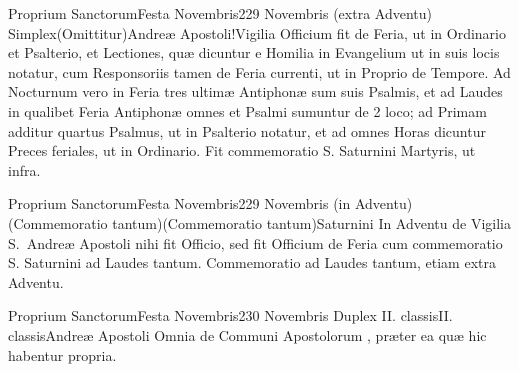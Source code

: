 \documentclass[nocturnale-romanum.tex]{subfiles}
\begin{document}
	{Proprium Sanctorum}{Festa Novembris}{2}{29 Novembris (extra Adventu)}
	{Simplex}{(Omittitur)}{Andreæ Apostoli!Vigilia}
	{Officium fit de Feria, ut in Ordinario et Psalterio, et Lectiones, quæ dicuntur e Homilia in Evangelium  ut in suis locis notatur, cum Responsoriis tamen de Feria currenti, ut in Proprio de Tempore. Ad Nocturnum vero in Feria  tres ultimæ Antiphonæ sum suis Psalmis, et ad Laudes in qualibet Feria Antiphonæ omnes et Psalmi sumuntur de 2 loco; ad Primam additur quartus Psalmus, ut in Psalterio notatur, et ad omnes Horas dicuntur Preces feriales, ut in Ordinario.}
	{Fit commemoratio S. Saturnini Martyris, ut infra.}

	{Proprium Sanctorum}{Festa Novembris}{2}{29 Novembris (in Adventu)}
	{(Commemoratio tantum)}{(Commemoratio tantum)}{Saturnini}
	{In Adventu de Vigilia S.\ Andreæ Apostoli nihi fit Officio, sed fit Officium de Feria cum commemoratio S. Saturnini ad Laudes tantum.}
	{Commemoratio ad Laudes tantum, etiam extra Adventu.}

	{Proprium Sanctorum}{Festa Novembris}{2}{30 Novembris}
	{Duplex II. classis}{II. classis}{Andreæ Apostoli}
	{Omnia de Communi Apostolorum \pageref{M-APEX}, præter ea quæ hic habentur propria.}
	{}
\tedeumrubric
\end{document}
